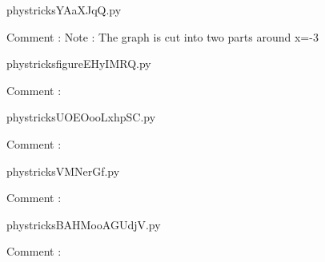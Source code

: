 
    \newcommand{\CaptionFigYAaXJqQ}{<+Type your caption here+>}
    \begin{center}
        
    \end{center}
    phystricksYAaXJqQ.py

    Comment : Note : The graph is cut into two parts around x=-3

    \clearpage
    


    \newcommand{\CaptionFigfigureEHyIMRQ}{<+Type your caption here+>}
    \begin{center}
        
    \end{center}
    phystricksfigureEHyIMRQ.py

    Comment : 

    \clearpage
    


    \newcommand{\CaptionFigUOEOooLxhpSC}{<+Type your caption here+>}
    \begin{center}
        
    \end{center}
    phystricksUOEOooLxhpSC.py

    Comment : 

    \clearpage
    


    \newcommand{\CaptionFigVMNerGf}{<+Type your caption here+>}
    \begin{center}
        
    \end{center}
    phystricksVMNerGf.py

    Comment : 

    \clearpage
    


    \newcommand{\CaptionFigBAHMooAGUdjV}{<+Type your caption here+>}
    \begin{center}
        
    \end{center}
    phystricksBAHMooAGUdjV.py

    Comment : 

    \clearpage
    


